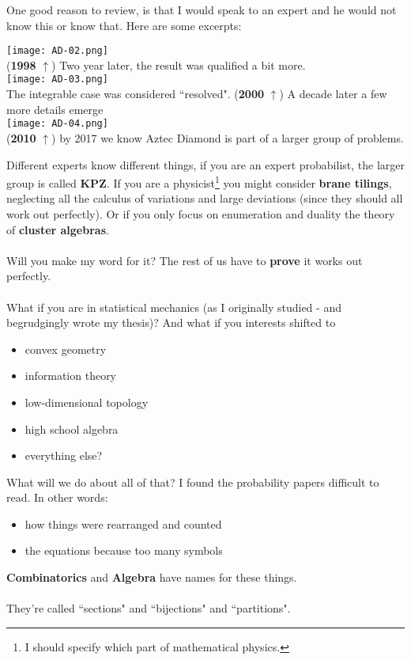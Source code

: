 \documentclass[12pt]{article}
\begin{document}
\newpage

\noindent One good reason to review, is that I would speak to an expert and he would not know this or know that.  Here are some excerpts:

\texttt{[image: AD-02.png]} \\
(\textbf{1998} $\uparrow$) Two year later, the result was qualified a bit more.\\
\texttt{[image: AD-03.png]} \\
The integrable case was considered ``resolved".  (\textbf{2000} $\uparrow$)  A decade later a few more details emerge \\
\texttt{[image: AD-04.png]} \\
(\textbf{2010} $\uparrow$) by 2017 we know Aztec Diamond is part of a larger group of problems.

\newpage

\noindent Different experts know different things, if you are an expert probabilist, the larger group is called \textbf{KPZ}.  If you are a physicist\footnote{I should specify which part of mathematical physics.} you might consider \textbf{brane tilings}, neglecting all the calculus of variations and large deviations (since they should all work out perfectly). Or if you only focus on enumeration and duality the theory of \textbf{cluster algebras}. \\ \\
Will you make my word for it? The rest of us have to \textbf{prove} it works out perfectly. \\ \\ 
What if you are in statistical mechanics (as I originally studied - and begrudgingly wrote my thesis)?  And what if you interests shifted to
\begin{itemize}
\item convex geometry 
\item information theory
\item low-dimensional topology
\item high school algebra 
\item everything else?
\end{itemize}
What will we do about all of that?  I found the probability papers difficult to read.  In other words:
\begin{itemize}
\item how things were rearranged and counted
\item the equations because too many symbols
\end{itemize}
\textbf{Combinatorics} and \textbf{Algebra} have names for these things. \\ \\ They're called ``sections" and ``bijections" and ``partitions".
\end{document}
